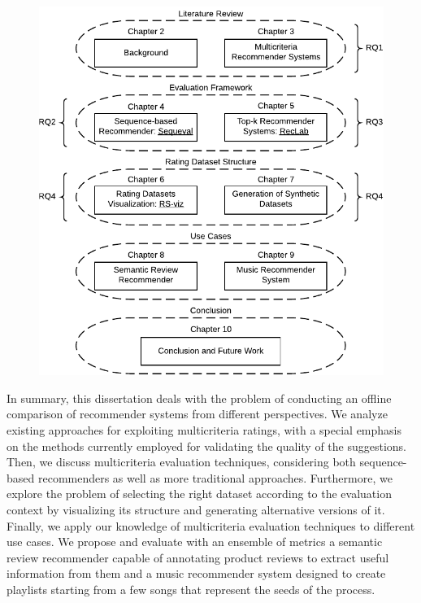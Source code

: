 \begin{figure}
\centering
\includegraphics[width=\textwidth]{structure}
\caption[Overview of the dissertation structure]{}
\label{int:fig:structure}
\end{figure}

In summary,  this dissertation deals with the problem of conducting an offline comparison of recommender systems from different perspectives. We analyze existing approaches for exploiting multicriteria ratings, with a special emphasis on the methods currently employed for validating the quality of the suggestions. Then, we discuss multicriteria evaluation techniques, considering both sequence-based recommenders as well as more traditional approaches. Furthermore, we explore the problem of selecting the right dataset according to the evaluation context by visualizing its structure and generating alternative versions of it. Finally, we apply our knowledge of multicriteria evaluation techniques to different use cases. We propose and evaluate with an ensemble of metrics a semantic review recommender capable of annotating product reviews to extract useful information from them and a music recommender system designed to create playlists starting from a few songs that represent the seeds of the process.

